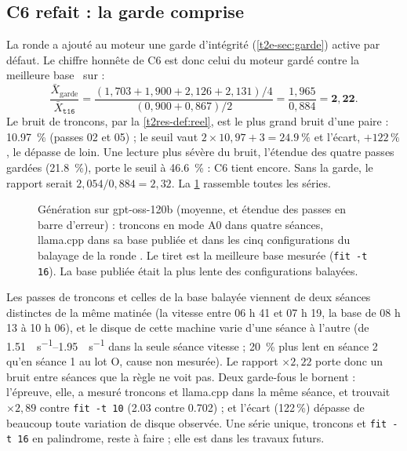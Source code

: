 \subsection{C6 refait : la garde comprise}\label{t2res-sec:c6}

La ronde a ajouté au moteur une garde d'intégrité (\cref{t2e-sec:garde}) active par défaut. Le chiffre honnête de C6 est donc celui du moteur gardé contre la meilleure base \calc~sur \mes :
\[
\frac{\bar X_{\text{garde}}}{\bar X_{\texttt{t16}}} = \frac{(1{,}703 + 1{,}900 + 2{,}126 + 2{,}131)/4}{(0{,}900 + 0{,}867)/2} = \frac{1{,}965}{0{,}884} = \mathbf{2{,}22}.
\]
Le bruit de troncons, par la \cref{t2res-def:reel}, est le plus grand bruit d'une paire : \SI{10.97}{\percent} (passes 02 et 05) ; le seuil vaut $2 \times 10{,}97 + 3 = \SI{24.9}{\percent}$ et l'écart, $+122\,\%$, le dépasse de loin. Une lecture plus sévère du bruit, l'étendue des quatre passes gardées (\SI{21.8}{\percent}), porte le seuil à \SI{46.6}{\percent} : C6 tient encore. Sans la garde, le rapport serait $2{,}054 / 0{,}884 = 2{,}32$. La \cref{t2res-fig:vitesse} rassemble toutes les séries.

\begin{figure}[ht]
\centering
\GrapheResVitesse
\caption[Génération : troncons contre llama.cpp]{Génération sur gpt-oss-120b (moyenne, et étendue des passes en barre d'erreur) : troncons en mode A0 dans quatre séances, llama.cpp dans sa base publiée et dans les cinq configurations du balayage de la ronde \mes. Le tiret est la meilleure base mesurée (\texttt{fit -t 16}). La base publiée était la plus lente des configurations balayées.}
\label{t2res-fig:vitesse}
\end{figure}

\begin{remarque}
Les passes de troncons et celles de la base balayée viennent de deux séances distinctes de la même matinée (la vitesse entre 06 h 41 et 07 h 19, la base de 08 h 13 à 10 h 06), et le disque de cette machine varie d'une séance à l'autre (de \SIrange{1.51}{1.95}{\Go\per\second} dans la seule séance vitesse ; \SI{20}{\percent} plus lent en séance 2 qu'en séance 1 au lot O, cause non mesurée). Le rapport $\times 2{,}22$ porte donc un bruit entre séances que la règle ne voit pas. Deux garde-fous le bornent : l'épreuve, elle, a mesuré troncons et llama.cpp dans la même séance, et trouvait $\times 2{,}89$ contre \texttt{fit -t 10} (\num{2.03} contre \num{0.702}) ; et l'écart (122\,\%) dépasse de beaucoup toute variation de disque observée. Une série unique, troncons et \texttt{fit -t 16} en palindrome, reste à faire ; elle est dans les travaux futurs.
\end{remarque}

